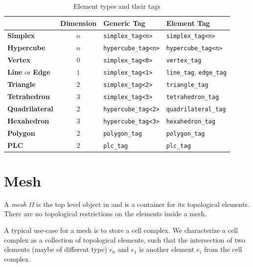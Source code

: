 \begin{table}[tbp]
 \centering
 \renewcommand{\arraystretch}{1.3}
\begin{tabular}{|l|c|l|l|}
\hline
          & Dimension & Generic Tag & Element Tag \\
\hline
 \textbf{Simplex}                 & $n$ & \lstinline|simplex_tag<n>|   & \lstinline|simplex_tag<n>| \\
 \textbf{Hypercube}               & $n$ & \lstinline|hypercube_tag<n>| & \lstinline|hypercube_tag<n>| \\
 \textbf{Vertex}                  & $0$ & \lstinline|simplex_tag<0>|   & \lstinline|vertex_tag| \\
 \textbf{Line} or \textbf{Edge}   & $1$ & \lstinline|simplex_tag<1>|   & \lstinline|line_tag|, \lstinline|edge_tag| \\
 \textbf{Triangle}                & $2$ & \lstinline|simplex_tag<2>|   & \lstinline|triangle_tag| \\
 \textbf{Tetrahedron}             & $3$ & \lstinline|simplex_tag<3>|   & \lstinline|tetrahedron_tag| \\
 \textbf{Quadrilateral}           & $2$ & \lstinline|hypercube_tag<2>| & \lstinline|quadrilateral_tag| \\
 \textbf{Hexahedron}              & $3$ & \lstinline|hypercube_tag<3>| & \lstinline|hexahedron_tag| \\
 \textbf{Polygon}                 & $2$ & \lstinline|polygon_tag|      & \lstinline|polygon_tag| \\
 \textbf{PLC}                     & $2$ & \lstinline|plc_tag|          & \lstinline|plc_tag| \\
\hline
\end{tabular}
\caption{Element types and their tags}
\label{tab:element-type-and-tags}
\end{table}


\section{Mesh}
A \emph{mesh} $\Omega$ is the top level object in {\ViennaGrid} and is a container for its topological elements.
There are no topological restrictions on the elements inside a mesh.

A typical use-case for a mesh is to store a cell complex.
We characterize a cell complex as a collection of topological elements, such that the intersection of two elements (maybe of different type) $e_0$ and $e_1$ is another element $e_i$ from the cell complex.

